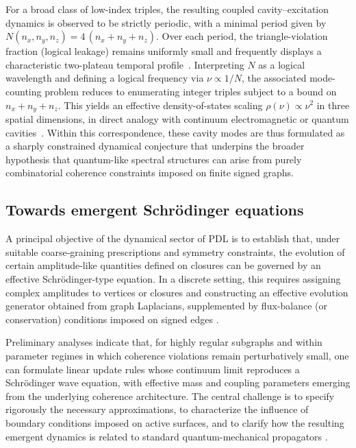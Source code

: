 \documentclass{article}
\begin{document}
For a broad class of low-index triples, the resulting coupled cavity–excitation dynamics is observed to be strictly periodic, with a minimal period given by $N(n_x,n_y,n_z)=4\,(n_x+n_y+n_z)$. Over each period, the triangle-violation fraction (logical leakage) remains uniformly small and frequently displays a characteristic two-plateau temporal profile~\citep{PDLCavityModes2026}. Interpreting $N$ as a logical wavelength and defining a logical frequency via $\nu\propto 1/N$, the associated mode-counting problem reduces to enumerating integer triples subject to a bound on $n_x+n_y+n_z$. This yields an effective density-of-states scaling $\rho(\nu)\propto \nu^2$ in three spatial dimensions, in direct analogy with continuum electromagnetic or quantum cavities~\citep{PDLCavityModes2026}. Within this correspondence, these cavity modes are thus formulated as a sharply constrained dynamical conjecture that underpins the broader hypothesis that quantum-like spectral structures can arise from purely combinatorial coherence constraints imposed on finite signed graphs.

\subsection{Towards emergent Schr\"odinger equations}
\label{subsec:emergent_schrodinger}

A principal objective of the dynamical sector of PDL is to establish that, under suitable coarse‑graining prescriptions and symmetry constraints, the evolution of certain amplitude-like quantities defined on closures can be governed by an effective Schr\"odinger-type equation. In a discrete setting, this requires assigning complex amplitudes to vertices or closures and constructing an effective evolution generator obtained from graph Laplacians, supplemented by flux-balance (or conservation) conditions imposed on signed edges \citep{Coherence_Leakage_18_2026,Coherence_Leakage_18_2026}.

Preliminary analyses indicate that, for highly regular subgraphs and within parameter regimes in which coherence violations remain perturbatively small, one can formulate linear update rules whose continuum limit reproduces a Schr\"odinger wave equation, with effective mass and coupling parameters emerging from the underlying coherence architecture. The central challenge is to specify rigorously the necessary approximations, to characterize the influence of boundary conditions imposed on active surfaces, and to clarify how the resulting emergent dynamics is related to standard quantum-mechanical propagators \citep{Coherence_Leakage_18_2026,PDL_position}.
\end{document}
